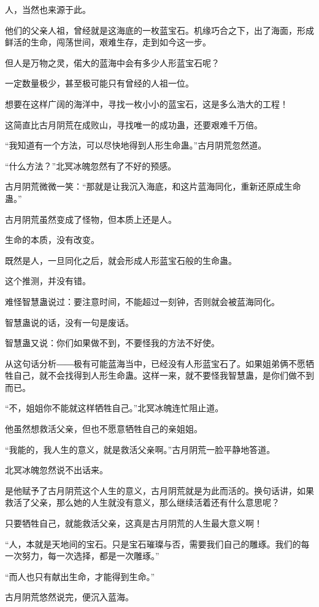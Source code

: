 \begin{this_body}
人，当然也来源于此。

他们的父亲人祖，曾经就是这海底的一枚蓝宝石。机缘巧合之下，出了海面，形成鲜活的生命，闯荡世间，艰难生存，走到如今这一步。

但人是万物之灵，偌大的蓝海中会有多少人形蓝宝石呢？

一定数量极少，甚至极可能只有曾经的人祖一位。

想要在这样广阔的海洋中，寻找一枚小小的蓝宝石，这是多么浩大的工程！

这简直比古月阴荒在成败山，寻找唯一的成功蛊，还要艰难千万倍。

“我知道有一个方法，可以尽快地得到人形生命蛊。”古月阴荒忽然道。

“什么方法？”北冥冰魄忽然有了不好的预感。

古月阴荒微微一笑：“那就是让我沉入海底，和这片蓝海同化，重新还原成生命蛊。”

古月阴荒虽然变成了怪物，但本质上还是人。

生命的本质，没有改变。

既然是人，一旦同化之后，就会形成人形蓝宝石般的生命蛊。

这个推测，并没有错。

难怪智慧蛊说过：要注意时间，不能超过一刻钟，否则就会被蓝海同化。

智慧蛊说的话，没有一句是废话。

智慧蛊又说：你们如果做不到，不要怪我的方法不好使。

从这句话分析――极有可能蓝海当中，已经没有人形蓝宝石了。如果姐弟俩不愿牺牲自己，就不会找得到人形生命蛊。这样一来，就不要怪我智慧蛊，是你们做不到而已。

“不，姐姐你不能就这样牺牲自己。”北冥冰魄连忙阻止道。

他虽然想救活父亲，但也不愿意牺牲自己的亲姐姐。

“我能的，我人生的意义，就是救活父亲啊。”古月阴荒一脸平静地答道。

北冥冰魄忽然说不出话来。

是他赋予了古月阴荒这个人生的意义，古月阴荒就是为此而活的。换句话讲，如果救活了父亲，那么她的人生就没有意义，那么继续活着还有什么意思呢？

只要牺牲自己，就能救活父亲，这真是古月阴荒的人生最大意义啊！

“人，本就是天地间的宝石。只是宝石璀璨与否，需要我们自己的雕琢。我们的每一次努力，每一次选择，都是一次雕琢。”

“而人也只有献出生命，才能得到生命。”

古月阴荒悠然说完，便沉入蓝海。


\end{this_body}
